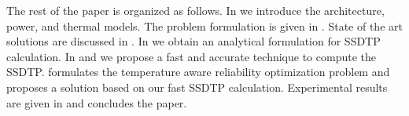 The rest of the paper is organized as follows. In  we introduce the architecture, power, and thermal models. The problem formulation is given in . State of the art solutions are discussed in . In  we obtain an analytical formulation for SSDTP calculation. In  and  we propose a fast and accurate technique to compute the SSDTP.  formulates the temperature aware reliability optimization problem and proposes a solution based on our fast SSDTP calculation. Experimental results are given in  and  concludes the paper.
